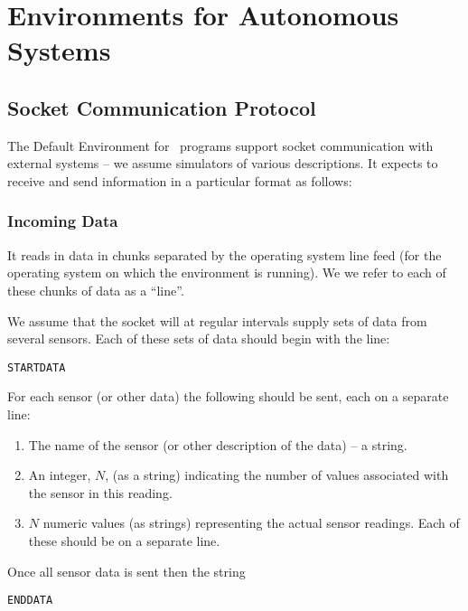 \chapter{Environments for Autonomous Systems}

\section{Socket Communication Protocol}

The Default Environment for \eass\ programs support socket communication with external systems -- we assume simulators of various descriptions.  It expects to receive and send information in a particular format as follows:

\subsection{Incoming Data}

It reads in data in chunks separated by the operating system line feed (for the operating system on which the environment is running).  We we refer to each of these chunks of data as a ``line''.

We assume that the socket will at regular intervals supply sets of data from several sensors.  Each of these sets of data should begin with the line:

\begin{center}
\texttt{STARTDATA}
\end{center} 

For each sensor (or other data) the following should be sent, each on a separate line:

\begin{enumerate}
\item The name of the sensor (or other description of the data) -- a string.
\item An integer, $N$, (as a string) indicating the number of values associated with the sensor in this reading.
\item $N$ numeric values (as strings) representing the actual sensor readings.  Each of these should be on a separate line.
\end{enumerate}

Once all sensor data is sent then the string

\begin{center}
\texttt{ENDDATA}
\end{center} 

